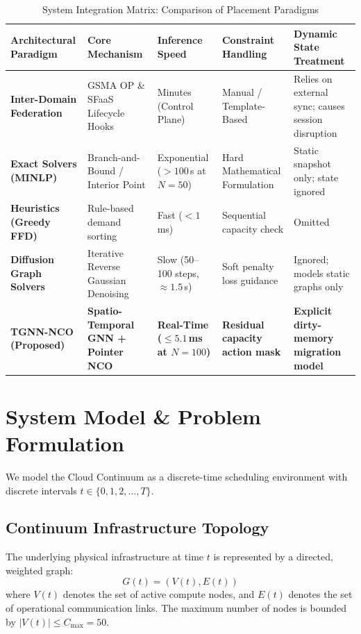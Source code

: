 \documentclass[conference]{IEEEtran}
\begin{document}
\begin{table}[t]
\caption{System Integration Matrix: Comparison of Placement Paradigms}
\label{tab:gap_matrix}
\centering
\begin{tabularx}{\textwidth}{lXXXX}
\toprule
\textbf{Architectural Paradigm} & \textbf{Core Mechanism} & \textbf{Inference Speed} & \textbf{Constraint Handling} & \textbf{Dynamic State Treatment} \\
\midrule
\textbf{Inter-Domain Federation}~\cite{dalgitsis2024federation, gsma_opg01} & GSMA OP \& SFaaS Lifecycle Hooks & Minutes (Control Plane) & Manual / Template-Based & Relies on external sync; causes session disruption \\
\textbf{Exact Solvers (MINLP)}~\cite{beal2018gekko} & Branch-and-Bound / Interior Point & Exponential ($>100$\,s at $N=50$) & Hard Mathematical Formulation & Static snapshot only; state ignored \\
\textbf{Heuristics (Greedy FFD)} & Rule-based demand sorting & Fast ($<1$\,ms) & Sequential capacity check & Omitted \\
\textbf{Diffusion Graph Solvers}~\cite{sun2023difusco} & Iterative Reverse Gaussian Denoising & Slow (50--100 steps, $\approx 1.5$\,s) & Soft penalty loss guidance & Ignored; models static graphs only \\
\midrule
\textbf{TGNN-NCO (Proposed)} & \textbf{Spatio-Temporal GNN + Pointer NCO} & \textbf{Real-Time ($\le 5.1$\,ms at $N=100$)} & \textbf{Residual capacity action mask} & \textbf{Explicit dirty-memory migration model} \\
\bottomrule
\end{tabularx}
\end{table}


\section{System Model \& Problem Formulation}
\label{sec:model}

We model the Cloud Continuum as a discrete-time scheduling environment with discrete intervals $t \in \{0, 1, 2, \dots, T\}$.

\subsection{Continuum Infrastructure Topology}
The underlying physical infrastructure at time $t$ is represented by a directed, weighted graph:
\begin{equation}
G(t) = (V(t), E(t))
\end{equation}
where $V(t)$ denotes the set of active compute nodes, and $E(t)$ denotes the set of operational communication links. The maximum number of nodes is bounded by $|V(t)| \le C_{\max} = 50$.
\end{document}
